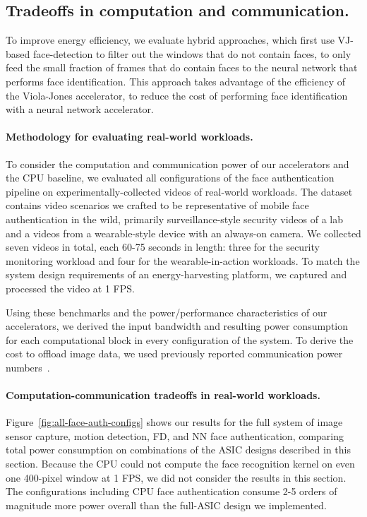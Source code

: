 \subsection{Tradeoffs in computation and communication.} To improve energy efficiency, we evaluate hybrid approaches, which first use VJ-based face-detection
to filter out the windows that do not contain faces, to only feed the small fraction of frames that do contain faces to the neural network that performs face identification.
This approach takes advantage of the efficiency of the Viola-Jones accelerator, to reduce the cost of performing face identification with a neural network accelerator.


\paragraph{Methodology for evaluating real-world workloads.} To consider the computation and communication power of our accelerators and the CPU baseline, we evaluated all configurations of the face authentication pipeline on experimentally-collected videos of real-world workloads.
The dataset contains video scenarios we crafted to be representative of mobile face authentication in the wild, primarily surveillance-style security videos of a lab and a videos from a wearable-style device with an always-on camera.
We collected seven videos in total, each 60-75 seconds in length: three for the security monitoring workload and four for the wearable-in-action workloads.
To match the system design requirements of an energy-harvesting platform, we captured and processed the video at 1 FPS.

Using these benchmarks and the power/performance characteristics of our accelerators, we derived the input bandwidth and resulting power consumption for each computational block in every configuration of the system. To derive the cost to offload image data, we used previously reported communication power numbers~\cite{wispcam}.

\paragraph{Computation-communication tradeoffs in real-world workloads.} Figure~\ref{fig:all-face-auth-configs} shows our results for the full system of image sensor capture, motion detection, FD, and NN face authentication, comparing total power consumption on combinations of the ASIC designs described in this section. Because the CPU could not compute the face recognition kernel on even one 400-pixel window at 1 FPS, we did not consider the results in this section. The configurations including CPU face authentication consume 2-5 orders of magnitude more power overall than the full-ASIC design we implemented.



